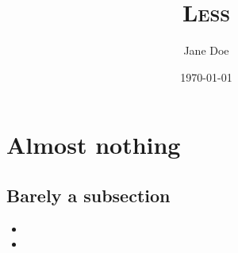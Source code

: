 \documentclass[a4paper, 10pt]{article}
\title{\textsc{Less}\vspace{-2ex}}
\author{\normalsize Jane Doe}
\date{\vspace{-3ex}\normalsize\today\vspace{3ex}}
\begin{document}
\maketitle

\section*{Almost nothing}
\lipsum[5][3-5]
\subsection*{Barely a subsection}
\lipsum[4]

\begin{itemize}
  \item \lipsum[5][1]
  \item \lipsum[5][2]
\end{itemize}
\end{document}

